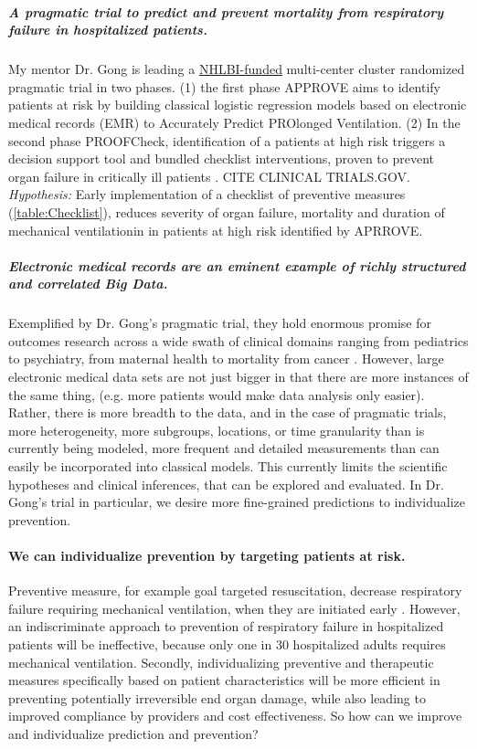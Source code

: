 \documentclass[11pt,notitlepage]{article}
\begin{document}
\subparagraph{A pragmatic trial to predict and prevent mortality from respiratory failure in hospitalized patients.}  My mentor Dr. Gong is leading a \href{http://projectreporter.nih.gov/project_info_description.cfm?projectnumber=1UH2HL125119-01}{NHLBI-funded} multi-center cluster randomized pragmatic trial in two phases. (1) the first phase APPROVE aims to identify patients at risk by building classical logistic regression models based on electronic medical records (EMR) to Accurately Predict PROlonged Ventilation. (2) In the second phase PROOFCheck, identification of a patients at high risk triggers a decision support tool and bundled checklist interventions, proven to prevent organ failure in critically ill patients \cite{Levy_23103175,Lim_19783532,Barr_23269131,Girard_18191684,Hebert_9971864}. CITE CLINICAL TRIALS.GOV. \emph{Hypothesis:} Early implementation of a checklist of preventive measures (\ref{table:Checklist}), reduces severity of organ failure, mortality and duration of mechanical ventilationin in patients at high risk identified by APRROVE. 

\subparagraph{Electronic medical records are an eminent example of richly structured and correlated Big Data.} Exemplified by Dr. Gong's pragmatic trial, they hold enormous promise for outcomes research across a wide swath of clinical domains ranging from pediatrics to psychiatry, from maternal health to mortality from cancer \cite{Dean_19279318,Amarasingham20940649,Welch24782349,Smeeth_15602021,Dave_20819960,Man_23272239}. However, large electronic medical data sets are not just bigger in that there are more instances of the same thing, (e.g. more patients would make data analysis only easier).  Rather, there is more breadth to the data, and in the case of pragmatic trials, more heterogeneity, more subgroups, locations, or time granularity than is currently being modeled, more frequent and detailed measurements than can easily be incorporated into classical models.  This currently limits the scientific hypotheses and clinical inferences, that can be explored and evaluated. In Dr. Gong's trial in particular, we desire more fine-grained predictions to individualize prevention.  

\paragraph*{We can individualize prevention by targeting patients at risk.}
Preventive measure, for example goal targeted resuscitation, decrease respiratory failure requiring mechanical ventilation, when they are initiated early \cite{Rivers_12594312}. However, an indiscriminate approach to prevention of respiratory failure in hospitalized patients will be ineffective, because only one in 30 hospitalized adults requires mechanical ventilation. Secondly, individualizing preventive and therapeutic measures specifically based on patient characteristics will be more efficient in preventing potentially irreversible end organ damage, while also  leading to improved compliance by providers and cost effectiveness. So how can we improve and individualize prediction and prevention? 
\end{document}
